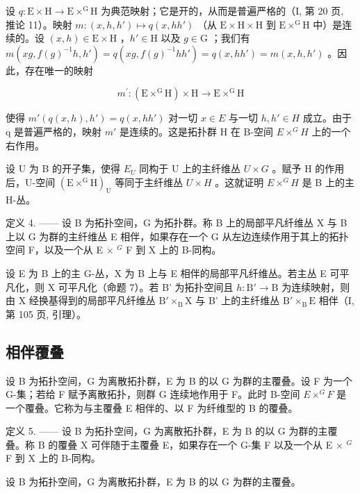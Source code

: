 设 \(q \colon \mathrm{E} \times \mathrm{H} \to \mathrm{E} \times^{\mathrm{G}} \mathrm{H}\) 为典范映射；它是开的，从而是普遍严格的（I, 第 20 页, 推论 11）。映射 \(m \colon (x, h, h') \mapsto q(x, hh')\) （从 \(\mathrm{E} \times \mathrm{H} \times \mathrm{H}\) 到 \(\mathrm{E} \times^{\mathrm{G}} \mathrm{H}\) 中）是连续的。设 \((x, h) \in \mathrm{E} \times \mathrm{H}\) ，\(h' \in \mathrm{H}\) 以及 \(g \in \mathrm{G}\) ；我们有 \(m(xg, f(g)^{-1}h, h') = q(xg, f(g)^{-1}hh') = q(x, hh') = m(x, h, h')\) 。因此，存在唯一的映射

\[
m ^ {\prime} \colon (\mathrm{E} \times^ {\mathrm{G}} \mathrm{H}) \times \mathrm{H} \rightarrow \mathrm{E} \times^ {\mathrm{G}} \mathrm{H}
\]

使得 \(m'(q(x,h),h') = q(x,hh')\) 对一切 \(x \in E\) 与一切 \(h, h' \in H\) 成立。由于 q 是普遍严格的，映射 \(m'\) 是连续的。这是拓扑群 H 在 B-空间 \(E \times^{G} H\) 上的一个右作用。

设 U 为 B 的开子集，使得 \(E_{U}\) 同构于 U 上的主纤维丛 \(U \times G\) 。赋予 H 的作用后，U-空间 \((\mathrm{E} \times^{\mathrm{G}}\mathrm{H})_{\mathrm{U}}\) 等同于主纤维丛 \(U \times H\) 。这就证明 \(E \times^{G}H\) 是 B 上的主 H-丛。

定义 4. —— 设 B 为拓扑空间，G 为拓扑群。称 B 上的局部平凡纤维丛 X 与 B 上以 G 为群的主纤维丛 E 相伴，如果存在一个 G 从左边连续作用于其上的拓扑空间 F，以及一个从 E × \(^{G}\) F 到 X 上的 B-同构。

设 E 为 B 上的主 G-丛，X 为 B 上与 E 相伴的局部平凡纤维丛。若主丛 E 可平凡化，则 X 可平凡化（命题 7）。若 B' 为拓扑空间且 \(h \colon \mathrm{B}' \to \mathrm{B}\) 为连续映射，则由 X 经换基得到的局部平凡纤维丛 \(\mathrm{B}' \times_{\mathrm{B}} \mathrm{X}\) 与 B' 上的主纤维丛 \(\mathrm{B}' \times_{\mathrm{B}} \mathrm{E}\) 相伴（I, 第 105 页, 引理）。

\subsection{相伴覆叠}

设 B 为拓扑空间，G 为离散拓扑群，E 为 B 的以 G 为群的主覆叠。设 F 为一个 G-集；若给 F 赋予离散拓扑，则群 G 连续地作用于 F。此时 B-空间 \(E \times^{G} F\) 是一个覆叠。它称为与主覆叠 E 相伴的、以 F 为纤维型的 B 的覆叠。

定义 5. —— 设 B 为拓扑空间，G 为离散拓扑群，E 为 B 的以 G 为群的主覆叠。称 B 的覆叠 X 可伴随于主覆叠 E，如果存在一个 G-集 F 以及一个从 E × \(^{G}\) F 到 X 上的 B-同构。

设 B 为拓扑空间，G 为离散拓扑群，E 为 B 的以 G 为群的主覆叠。

